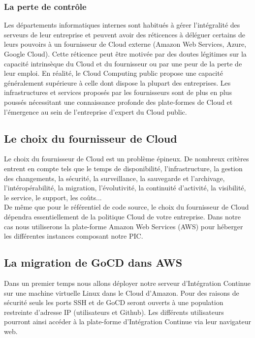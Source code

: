         \subsubsection{La perte de contrôle}
        Les départements informatiques internes sont habitués à gérer l'intégralité des serveurs de leur entreprise et peuvent avoir des réticences à déléguer certains de leurs pouvoirs à un fournisseur de Cloud externe (Amazon Web Services, Azure, Google Cloud). Cette réticence peut être motivée par des doutes légitimes sur la capacité intrinsèque du Cloud et du fournisseur ou par une peur de la perte de leur emploi. En réalité, le Cloud Computing public propose une capacité généralement supérieure à celle dont dispose la plupart des entreprises. Les infrastructures et services proposés par les fournisseurs sont de plus en plus poussés nécessitant une connaissance profonde des plate-formes de Cloud et l'émergence au sein de l'entreprise d'expert du Cloud public.

      \subsection{Le choix du fournisseur de Cloud}
      Le choix du fournisseur de Cloud est un problème épineux. De nombreux critères entrent en compte tels que le temps de disponibilité, l'infrastructure, la gestion des changements, la sécurité, la surveillance, la sauvegarde et l'archivage, l'intéropérabilité, la migration, l'évolutivité, la continuité d'activité, la visibilité, le service, le support, les coûts...\\

      De même que pour le référentiel de code source, le choix du fournisseur de Cloud dépendra essentiellement de la politique Cloud de votre entreprise. Dans notre cas nous utiliserons la plate-forme Amazon Web Services (\gls{AWS}) pour héberger les différentes instances composant notre PIC.

      \subsection{La migration de GoCD dans AWS}
      Dans un premier temps nous allons déployer notre serveur d'Intégration Continue sur une machine virtuelle Linux dans le Cloud d'Amazon. Pour des raisons de sécurité seuls les ports SSH et de GoCD seront ouverts à une population restreinte d'adresse IP (utilisateurs et Github). Les différents utilisateurs pourront ainsi accéder à la plate-forme d'Intégration Continue via leur navigateur web.\\


